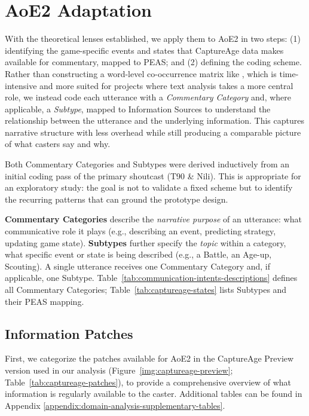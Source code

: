 \section{AoE2 Adaptation}
With the theoretical lenses established, we apply them to AoE2 in two steps: (1) identifying the game-specific events and states that CaptureAge data makes available for commentary, mapped to PEAS; and (2) defining the coding scheme. Rather than constructing a word-level co-occurrence matrix like \citet{metoyer2010}, which is time-intensive and more suited for projects where text analysis takes a more central role, we instead code each utterance with a \textit{Commentary Category} and, where applicable, a \textit{Subtype}, mapped to Information Sources to understand the relationship between the utterance and the underlying information. This captures narrative structure with less overhead while still producing a comparable picture of what casters say and why.

Both Commentary Categories and Subtypes were derived inductively from an initial coding pass of the primary shoutcast (T90 \& Nili). This is appropriate for an exploratory study: the goal is not to validate a fixed scheme but to identify the recurring patterns that can ground the prototype design.

\textbf{Commentary Categories} describe the \textit{narrative purpose} of an utterance: what communicative role it plays (e.g., describing an event, predicting strategy, updating game state). \textbf{Subtypes} further specify the \textit{topic} within a category, what specific event or state is being described (e.g., a Battle, an Age-up, Scouting). A single utterance receives one Commentary Category and, if applicable, one Subtype. Table~\ref{tab:communication-intents-descriptions} defines all Commentary Categories; Table~\ref{tab:captureage-states} lists Subtypes and their PEAS mapping.

\subsection{Information Patches}
First, we categorize the patches available for AoE2 in the CaptureAge Preview version used in our analysis (Figure~\ref{img:captureage-preview}; Table~\ref{tab:captureage-patches}), to provide a comprehensive overview of what information is regularly available to the caster. Additional tables can be found in Appendix \ref{appendix:domain-analysis-supplementary-tables}.


